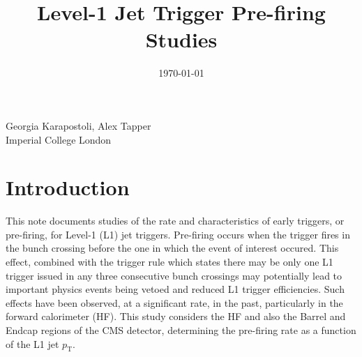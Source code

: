 \documentclass[11pt]{cmspaperpdf}
\newcommand{\pt}{\ensuremath{p_{\mathrm{T}}}\xspace}
\begin{document}
\begin{titlepage}


\date{\today}

\title{Level-1 Jet Trigger Pre-firing Studies}


\begin{Authlist}
Georgia Karapostoli, Alex Tapper\\
\small{Imperial College London}
\end{Authlist}


\end{titlepage}

\newpage
\section{Introduction}

This note documents studies of the rate and characteristics of early triggers, or pre-firing, for Level-1 (L1) jet triggers. Pre-firing occurs when the trigger fires in the bunch crossing before the one in which the event of interest occured. This effect, combined with the trigger rule which states there may be only one L1 trigger issued in any three consecutive bunch crossings may potentially lead to important physics events being vetoed and reduced L1 trigger efficiencies. Such effects have been observed, at a significant rate, in the past, particularly in the forward calorimeter (HF). This study considers the HF and also the Barrel and Endcap regions of the CMS detector, determining the pre-firing rate as a function of the L1 jet \pt. 
\end{document}
